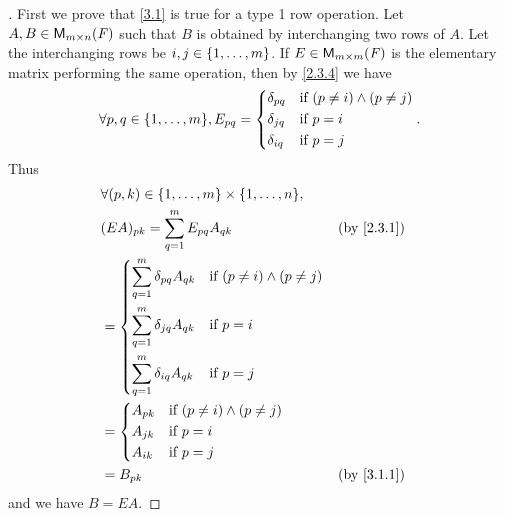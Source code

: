 \begin{proof}[]
	First we prove that \cref{3.1} is true for a type 1 row operation.
	Let \(A, B \in \MS\) such that \(B\) is obtained by interchanging two rows of \(A\).
	Let the interchanging rows be \(i, j \in \left\lbrace1, \dots, m\right\rbrace\).
	If \(E \in \ms[m][m][\F]\) is the elementary matrix performing the same operation, then by \cref{2.3.4} we have
	\[
		\forall p, q \in \set{1, \dots, m}, E_{p q} = \begin{dcases}
			\delta_{p q} & \text{if } (p \neq i) \land (p \neq j) \\
			\delta_{j q} & \text{if } p = i                       \\
			\delta_{i q} & \text{if } p = j
		\end{dcases}.
	\]
	Thus
	\begin{align*}
		 & \forall (p, k) \in \set{1, \dots, m} \times \set{1, \dots, n},                                  \\
		 & (EA)_{p k} = \sum_{q = 1}^m E_{p q} A_{q k}                                     &  & \by{2.3.1} \\
		 & = \begin{dcases}
			     \sum_{q = 1}^m \delta_{p q} A_{q k} & \text{if } (p \neq i) \land (p \neq j) \\
			     \sum_{q = 1}^m \delta_{j q} A_{q k} & \text{if } p = i                       \\
			     \sum_{q = 1}^m \delta_{i q} A_{q k} & \text{if } p = j
		     \end{dcases}                  \\
		 & = \begin{dcases}
			     A_{p k} & \text{if } (p \neq i) \land (p \neq j) \\
			     A_{j k} & \text{if } p = i                       \\
			     A_{i k} & \text{if } p = j
		     \end{dcases}                                              \\
		 & = B_{p k}                                                                       &  & \by{3.1.1}
	\end{align*}
	and we have \(B = EA\).


\end{proof}
